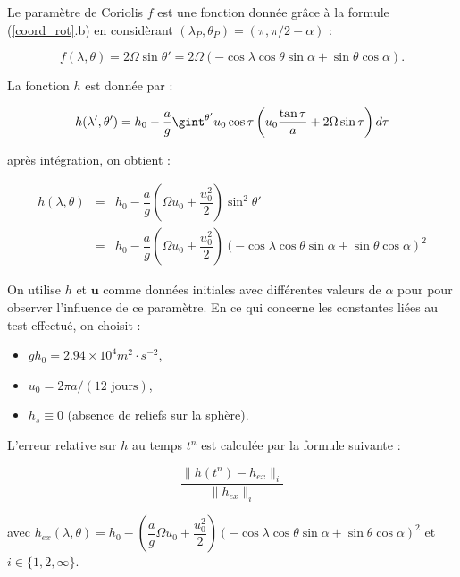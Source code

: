 Le paramètre de Coriolis $f$ est une fonction donnée grâce à la formule (\ref{coord_rot}.b) en considèrant $(\lambda_P, \theta_P) = (\pi, \pi/2 - \alpha)$ :

\begin{equation}
f (\lambda, \theta) = 2 \Omega \sin \theta' = 2 \Omega \left( - \cos \lambda \cos \theta \sin \alpha + \sin \theta \cos \alpha \right).
\end{equation}

La fonction $h$ est donnée par :

\begin{equation}
h(\lambda', \theta') = h_0 - \dfrac{a}{g} \gint^{\theta'} u_0 \cos \tau \left( u_0 \dfrac{\tan \tau}{a} + 2 \Omega \sin \tau \right) d \tau
\end{equation}

après intégration, on obtient :

\begin{equation}
\begin{array}{rcl}
h(\lambda, \theta) & = & h_0 - \dfrac{a}{g} \left( \Omega u_0 + \dfrac{u_0^2}{2} \right) \sin^2 \theta' \\
                   & = & h_0 - \dfrac{a}{g} \left( \Omega u_0 + \dfrac{u_0^2}{2} \right) \left( - \cos \lambda \cos \theta \sin \alpha + \sin \theta \cos \alpha \right)^2
\end{array}
\label{eq: williamson 2 initial height}
\end{equation}

On utilise $h$ et $\mathbf{u}$ comme données initiales avec différentes valeurs de $\alpha$ pour pour observer l'influence de ce paramètre. En ce qui concerne les constantes liées au test effectué, on choisit :
\begin{itemize}
\item $g h_0= 2.94 \times 10^4 m^2 \cdot \si{s^{-2}}$,
\item $u_0= 2 \pi a / (12 \text{ jours})$,
\item $h_s \equiv 0$ (absence de reliefs sur la sphère).
\end{itemize}

L'erreur relative sur $h$ au temps $t^n$ est calculée par la formule suivante :

\begin{equation}
\dfrac{\| h(t^n) - h_{ex}\|_i}{\| h_{ex} \|_i}
\end{equation}

avec $h_{ex}(\lambda, \theta) = h_0 - \left( \dfrac{a}{g} \Omega u_0 + \dfrac{u_0^2}{2} \right) \left( - \cos \lambda \cos \theta \sin \alpha + \sin \theta \cos \alpha \right)^2$ et $i \in \lbrace 1,2,\infty \rbrace$.

